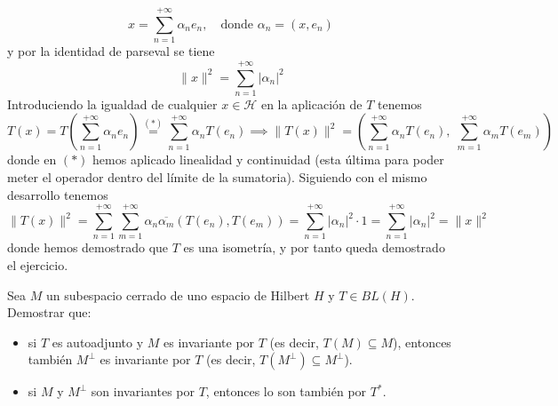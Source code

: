 \begin{ejercicio}
\begin{description}
        $$x = \sum_{n=1}^{+\infty} \alpha_n e_n, \quad \text{donde } \alpha_n = ( x, e_n )$$
        y por la identidad de parseval se tiene
        \begin{equation}\label{eq:parseval}
            \|x\|^2 = \sum_{n=1}^{+\infty} |\alpha_n|^2
        \end{equation}
        Introduciendo la igualdad de cualquier $x\in \mathcal{H}$ en la aplicación de $T$ tenemos
        \begin{equation*}
            T(x) = T\left( \sum_{n=1}^{+\infty} \alpha_n e_n \right) \overset{(*)}{=} \sum_{n=1}^{+\infty} \alpha_n T(e_n)\implies \|T(x)\|^2 = \left( \sum_{n=1}^{+\infty} \alpha_n T(e_n), \; \sum_{m=1}^{+\infty} \alpha_m T(e_m) \right)
        \end{equation*}
        donde en $(*)$ hemos aplicado linealidad y continuidad (esta última para poder meter el operador dentro del límite de la sumatoria). Siguiendo con el mismo desarrollo tenemos
        \begin{equation*}
            \|T(x)\|^2 = \sum_{n=1}^{+\infty} \sum_{m=1}^{+\infty} \alpha_n \overline{\alpha_m} ( T(e_n), T(e_m) )= \sum_{n=1}^{+\infty} |\alpha_n|^2 \cdot 1 = \sum_{n=1}^{+\infty} |\alpha_n|^2=\|x\|^2
        \end{equation*}
        donde hemos demostrado que $T$ es una isometría, y por tanto queda demostrado el ejercicio.
    \end{description}
\end{ejercicio}

\begin{ejercicio} %
    Sea $M$ un subespacio cerrado de uno espacio de Hilbert $H$ y $T \in BL(H)$. Demostrar que:
    \begin{itemize}
        \item[i)] si $T$ es autoadjunto y $M$ es invariante por $T$ (es decir, $T(M) \subseteq M$), entonces también $M^\perp$ es invariante por $T$ (es decir, $T(M^\perp) \subseteq M^\perp$).
        
        \item[ii)] si $M$ y $M^\perp$ son invariantes por $T$, entonces lo son también por $T^*$.
    \end{itemize}
\end{ejercicio}


